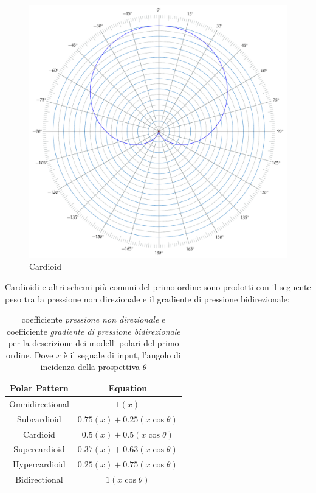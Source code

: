 \begin{figure}[h]
\centering
\includegraphics[width=1\columnwidth]{CAPITOLI/_TIKZ/POLAR/cardioid}
\caption{Cardioid}
\label{polar:cardioid}
\end{figure}

Cardioidi e altri schemi più comuni del primo ordine sono prodotti con il
seguente peso tra la pressione non direzionale e il gradiente di pressione
bidirezionale:

\begin{table}[h]
\begin{center}
\begin{tabular}{cc}
Polar Pattern & Equation \\
\hline
Omnidirectional & $ 1(x) $ \\
Subcardioid     & $ 0.75(x) + 0.25(x\cos\theta) $ \\
Cardioid        & $ 0.5(x) + 0.5(x\cos\theta) $ \\
Supercardioid   & $ 0.37(x) + 0.63(x\cos\theta) $ \\
Hypercardioid   & $ 0.25(x) + 0.75(x\cos\theta) $ \\
Bidirectional   & $ 1(x\cos\theta) $ \\
\end{tabular}
\end{center}
\caption{coefficiente \emph{pressione non direzionale} e coefficiente
\emph{gradiente di pressione bidirezionale} per la descrizione dei modelli
polari del primo ordine. Dove $ x $ è il segnale di input, l'angolo di incidenza
della prospettiva $\theta$}
\label{tab:polarcoef}
\end{table}

